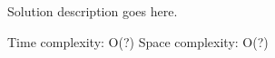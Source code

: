 
\begin{solutionstatement}
Solution description goes here.
\end{solutionstatement}

\begin{complexity}
Time complexity: O(?)
Space complexity: O(?)
\end{complexity}
